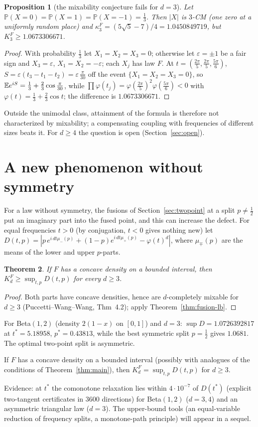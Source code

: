 \documentclass[11pt]{amsart}
\newtheorem{theorem}{Theorem}[section]\newtheorem{proposition}[theorem]{Proposition}\newtheorem{lemma}[theorem]{Lemma}
\theoremstyle{definition}\newtheorem{definition}[theorem]{Definition}\theoremstyle{remark}\newtheorem{remark}[theorem]{Remark}
\begin{document}
\begin{proposition}[the mixability conjecture fails for $d=3$]\label{prop:threepoint}
Let $\mathbb P(X=0)=\mathbb P(X=1)=\mathbb P(X=-1)=\frac13$. Then $|X|$ is $3$-CM (one zero at a uniformly random place) and $\kappa_3^F=(5\sqrt5-7)/4=1.0450849719$, but $K_3^F\ge1.0673306671$.
\end{proposition}
\begin{proof}With probability $\frac13$ let $X_1=X_2=X_3=0$; otherwise let $\varepsilon=\pm1$ be a fair sign and $X_3=\varepsilon$, $X_1=X_2=-\varepsilon$; each $X_j$ has law $F$. At
$t=(\frac{2\pi}5,\frac{2\pi}5,\frac{5\pi}6)$, $S=\varepsilon(t_3-t_1-t_2)=\varepsilon\,\frac\pi{30}$ off the event $\{X_1=X_2=X_3=0\}$, so $\mathbb E e^{iS}=\frac13+\frac23\cos\frac\pi{30}$, while $\prod\varphi(t_j)=\varphi(\frac{2\pi}5)^2\varphi(\frac{5\pi}6)<0$ with
$\varphi(t)=\frac13+\frac23\cos t$; the difference is $1.0673306671$.\end{proof}
\noindent Outside the unimodal class, attainment of the formula is therefore not characterized by mixability; a compensating coupling with frequencies of
different sizes beats it. For $d\ge4$ the question is open (Section~\ref{sec:open}).

\section{A new phenomenon without symmetry}\label{sec:nonsym}
For a law without symmetry, the fusions of Section~\ref{sec:twopoint} at a split $p\ne\frac12$ put an imaginary part into the fused point, and this can increase the
defect. For equal frequencies $t>0$ (by conjugation, $t<0$ gives nothing new) let $D(t,p)=|p\,e^{i\,dt\mu_-(p)}+(1-p)e^{i\,dt\mu_+(p)}-\varphi(t)^d|$, where $\mu_\mp(p)$ are the means of
the lower and upper $p$-parts.
\begin{theorem}\label{thm:nonsym-lb}
If $F$ has a concave density on a bounded interval, then $K_d^F\ge\sup_{t,p}D(t,p)$ for every $d\ge3$.
\end{theorem}
\begin{proof}Both parts have concave densities, hence are $d$-completely mixable for $d\ge3$ (Puccetti--Wang--Wang, Thm~4.2); apply Theorem~\ref{thm:fusion-lb}.\end{proof}
\noindent For Beta$(1,2)$ (density $2(1-x)$ on $[0,1]$) and $d=3$: $\sup D=1.0726392817$ at $t^*=5.18958$, $p^*=0.43813$, while the best symmetric split
$p=\frac12$ gives $1.0681$. The optimal two-point split is asymmetric.
\begin{conjecture}\label{conj:nonsym}If $F$ has a concave density on a bounded interval (possibly with analogues of the conditions of Theorem~\ref{thm:main}), then $K_d^F=\sup_{t,p}D(t,p)$ for $d\ge3$.\end{conjecture}
\noindent Evidence: at $t^*$ the comonotone relaxation lies within $4\cdot10^{-7}$ of $D(t^*)$ (explicit two-tangent certificates in $3600$ directions) for
Beta$(1,2)$ ($d=3,4$) and an asymmetric triangular law ($d=3$). The upper-bound tools (an equal-variable reduction of frequency splits, a monotone-path
principle) will appear in a sequel.
\end{document}
